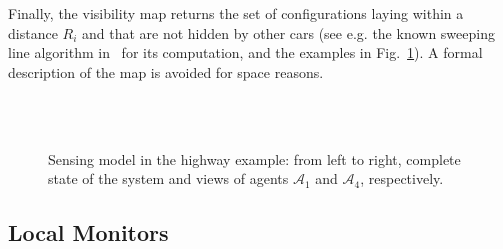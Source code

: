 Finally, the visibility map returns the set of configurations laying within a distance $R_i$ and that are not hidden by other cars (see e.g. the known sweeping line algorithm in~\cite{thrun2002pr} for its computation, and the examples in Fig.~\ref{fig:ids:model:visi}). A formal description of the map is avoided for space reasons.
\begin{figure}[!]
\centering
{}
\\
\vspace{5pt}
\vspace{5pt}
\\
\caption{Sensing model in the highway example: from left to right, complete state of the system and views of agents $\mathcal{A}_1$ and $\mathcal{A}_4$, respectively.}
\label{fig:ids:model:visi}
\end{figure}


\subsection{Local Monitors}

